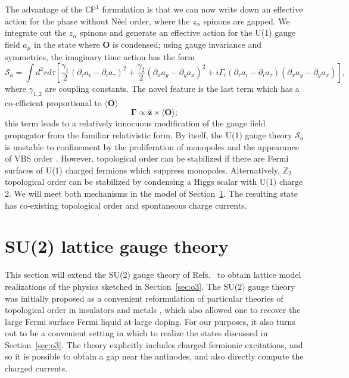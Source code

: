 \documentclass[aps,prb,preprint,onecolumn,citeautoscript,superscriptaddress,footinbib,
eqsecnum]{revtex4-1}
\newcommand{\beq}{\begin{equation}}
\newcommand{\eeq}{\end{equation}}
\begin{document}
The advantage of the $\mathbb{CP}^1$ formulation is that we can now write down an effective action for the phase without N\'eel order,
where the $z_\alpha$ spinons are gapped. We integrate out the $z_\alpha$ spinons and generate an effective action for the U(1) gauge field $a_\mu$
in the state where ${\bm O}$ is condensed; using gauge invariance and symmetries, the imaginary time action has the form
\beq
\mathcal{S}_a = \int d^2 r d \tau \left[ \frac{\gamma_1}{2} (\partial_\tau a_i - \partial_i a_\tau)^2 + \frac{\gamma_2}{2} (\partial_x a_y - \partial_y a_x)^2
+ i \Gamma_i (\partial_\tau a_i - \partial_i a_\tau)(\partial_x a_y - \partial_y a_x)\right], \label{Sa}
\eeq
where $\gamma_{1,2}$ are coupling constants. The novel feature is the last term which has a co-efficient proportional to $\langle {\bm O} \rangle$
\beq
{\bm \Gamma} \propto \hat{\bm z} \times \langle {\bm O} \rangle;
\eeq
this term leads to a relatively innocuous modification of the gauge field propagator from the familiar relativistic form.
By itself, the U(1) gauge theory $\mathcal{S}_a$ is unstable to confinement by 
the proliferation of monopoles and the appearance of VBS order \cite{NRSS89}.
However, topological order can be stabilized if there are Fermi surfaces of U(1) charged fermions \cite{2004PhRvB..70u4437H,2008NatPh...4...28K}
which suppress monopoles. Alternatively, $\mathbb{Z}_2$ topological order can be stabilized \cite{NRSS91,SSNR91,PhysRevB.44.2664} by condensing a Higgs scalar with U(1) charge 2. We will meet both mechanisms in the model of Section~\ref{sec:lattice}.
The resulting state has co-existing topological order and spontaneous charge currents.

\section{SU(2) lattice gauge theory}
\label{sec:lattice}

This section will extend the SU(2) gauge theory of Refs.~ 
to obtain lattice model realizations of the 
physics sketched in Section~\ref{sec:o3}. The SU(2) gauge theory was initially proposed as a convenient reformulation of 
particular theories of topological order in insulators \cite{NRSS89,NRSS90,NRSS91,SSNR91} and 
metals \cite{2007PhRvB..75w5122K,2008NatPh...4...28K,2008PhRvB..78d5110K}, which also allowed one to recover the large Fermi surface Fermi liquid at large doping. For our purposes, it also turns out to be a convenient setting in which to realize the states discussed in Section~\ref{sec:o3}.
The theory explicitly includes charged fermionic excitations, and so it is possible to obtain a gap near the antinodes,
and also directly compute the charged currents.
\end{document}
